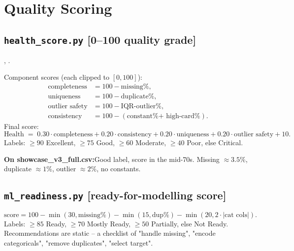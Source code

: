 \documentclass[11pt,a4paper]{article}
\newcommand{\code}[1]{\texttt{\detokenize{#1}}}
\newcommand{\predicts}{\par\noindent\textbf{\color{tealac}On showcase\_v3\_full.csv:}\space}
\begin{document}
\section{Quality Scoring}

\subsection{\texttt{\textbf{health\_score.py}} \textcolor{tealac}{\small\textsf{[0--100 quality grade]}}}

\begin{libsbox}
\code{pandas}, \code{numpy}.
\end{libsbox}

\begin{mathbox}
Component scores (each clipped to $[0, 100]$):
\[
\begin{aligned}
\text{completeness}    &= 100 - \text{missing\%},\\
\text{uniqueness}      &= 100 - \text{duplicate\%},\\
\text{outlier safety}  &= 100 - \text{IQR-outlier\%},\\
\text{consistency}     &= 100 - (\text{constant\% + high-card\%}).
\end{aligned}
\]
Final score:
\[
\mathrm{Health} \;=\; 0.30\cdot\text{completeness}
                   + 0.20\cdot\text{consistency}
                   + 0.20\cdot\text{uniqueness}
                   + 0.20\cdot\text{outlier safety}
                   + 10.
\]
Labels: $\geq 90$ Excellent, $\geq 75$ Good, $\geq 60$ Moderate,
$\geq 40$ Poor, else Critical.
\end{mathbox}

\predicts Good label, score in the mid-70s. Missing $\approx 3.5\%$,
duplicate $\approx 1\%$, outlier $\approx 2\%$, no constants.

\subsection{\texttt{\textbf{ml\_readiness.py}} \textcolor{tealac}{\small\textsf{[ready-for-modelling score]}}}

\begin{mathbox}
\[
\text{score} = 100 - \min(30, \text{missing\%}) - \min(15, \text{dup\%}) - \min(20, 2\cdot|\text{cat cols}|).
\]
Labels: $\geq 85$ Ready, $\geq 70$ Mostly Ready, $\geq 50$ Partially,
else Not Ready. Recommendations are static -- a checklist of "handle
missing", "encode categoricals", "remove duplicates", "select target".
\end{mathbox}
\end{document}
